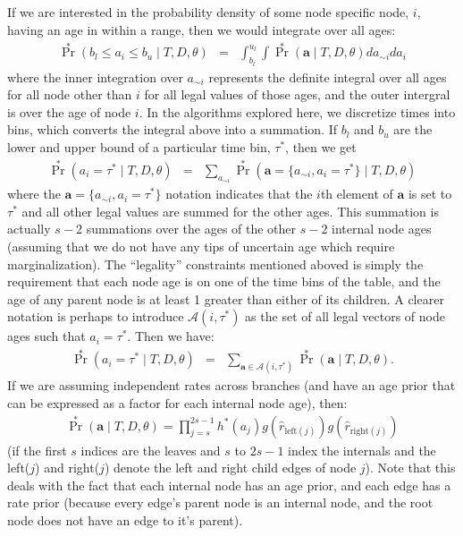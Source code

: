 \documentclass{llncs}
\begin{document}
If we are interested in the probability density of some node specific node, $i$, having an age in within a range,
 then we would integrate over all ages:
\begin{eqnarray}
    \Pr^{\ast}(b_l \leq a_i \leq b_u \mid T, D, \theta) & = & \int_{b_l}^{u_l} \int \Pr^{\ast}(\mathbf{a} \mid T, D, \theta) d a_{\sim i} d a_i
\end{eqnarray}
where the inner integration over $a_{\sim i}$ represents the definite integral over all 
    ages for all node other than $i$ for all legal values of those ages, and the outer
    intergral is over the age of node $i$.
In the algorithms explored here, we discretize times into bins, which converts the integral
    above into a summation.
If $b_l$ and $b_u$ are the lower and upper bound of a particular time bin, $\tau^{\ast}$, then we get
\begin{eqnarray}
    \Pr^{\ast}(a_i = \tau^{\ast} \mid T, D, \theta) & = & \sum_{a_{\sim i}} \Pr^{\ast}\left(\mathbf{a} = \{a_{\sim i}, a_i = \tau^{\ast}\} \mid T, D, \theta\right)
\end{eqnarray}
where the $\mathbf{a} = \{a_{\sim i}, a_i = \tau^{\ast}\}$ notation indicates that the $i$th element of $\mathbf{a}$
    is set to $\tau^{\ast}$ and all other legal values are summed for the other ages.
This summation is actually $s-2$ summations over the ages of the other $s-2$ internal node ages (assuming that we do 
    not have any tips of uncertain age which require marginalization).
The ``legality'' constraints mentioned aboved is simply the requirement that each node age is on one of the 
    time bins of the table, and the age of any parent node is at least 1 greater than either of its children.
A clearer notation is perhaps to introduce $\mathcal{A}\left(i,\tau^{\ast}\right)$ as the set of all legal
    vectors of node ages such that $a_i = \tau^{\ast}$.
Then we have:
\begin{eqnarray}
    \Pr^{\ast}(a_i = \tau^{\ast} \mid T, D, \theta) & = & \sum_{\mathbf{a} \in \mathcal{A}\left(i,\tau^{\ast}\right)}\Pr^{\ast}\left(\mathbf{a} \mid T, D, \theta\right). \label{ageSum}
\end{eqnarray}
If we are assuming independent rates across branches (and have an age prior that can be expressed as a factor for each internal node age), then:
\begin{eqnarray}
     \Pr^{\ast}\left(\mathbf{a} \mid T, D, \theta\right) = \prod_{j=s}^{2s-1} h^{\ast}(a_j)g(\hat{r}_{\mbox{left}(j)})g(\hat{r}_{\mbox{right}(j)})
\end{eqnarray}
(if the first $s$ indices are the leaves and $s$ to $2s-1$ index the internals and the left($j$) and right($j$) denote the left and right child edges of node $j$).
Note that this deals with the fact that each internal node has an age prior, and
    each edge has a rate prior (because every edge's parent node is an internal node, and the root node does not 
    have an edge to it's parent).
\end{document}
